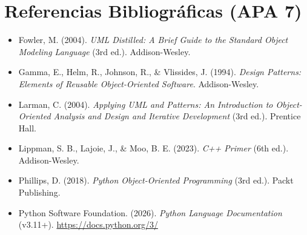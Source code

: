 \documentclass[12pt,a4paper]{article}
\begin{document}
\section*{Referencias Bibliográficas (APA 7)}
\begin{itemize}
    \item Fowler, M. (2004). \textit{UML Distilled: A Brief Guide to the Standard Object Modeling Language} (3rd ed.). Addison-Wesley.
    \item Gamma, E., Helm, R., Johnson, R., \& Vlissides, J. (1994). \textit{Design Patterns: Elements of Reusable Object-Oriented Software}. Addison-Wesley.
    \item Larman, C. (2004). \textit{Applying UML and Patterns: An Introduction to Object-Oriented Analysis and Design and Iterative Development} (3rd ed.). Prentice Hall.
    \item Lippman, S. B., Lajoie, J., \& Moo, B. E. (2023). \textit{C++ Primer} (6th ed.). Addison-Wesley.
    \item Phillips, D. (2018). \textit{Python Object-Oriented Programming} (3rd ed.). Packt Publishing.
    \item Python Software Foundation. (2026). \textit{Python Language Documentation} (v3.11+). \url{https://docs.python.org/3/}
\end{itemize}
\end{document}
